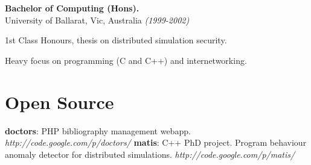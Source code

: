\documentclass[margin]{res}
\begin{document}
\begin{resume}
{\bf Bachelor of Computing (Hons).} \\
University of Ballarat, Vic, Australia {\em (1999-2002)} \\
\begin{description}
\item 1st Class Honours, thesis on distributed simulation security.
\item Heavy focus on programming (C and C++) and internetworking.
\end{description}


\section{Open Source}
{\bf doctors}: PHP bibliography management webapp.  {\em http://code.google.com/p/doctors/}
{\bf matis}: C++ PhD project.  Program behaviour anomaly detector for distributed simulations.  {\em http://code.google.com/p/matis/}




 




\end{resume} 
\end{document}
